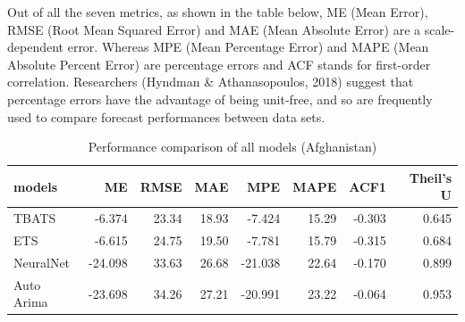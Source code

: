 \documentclass[11pt,oneside,a4paper]{reedthesis}
\newenvironment{Shaded}{\begin{snugshade}}{\end{snugshade}}
\newcommand{\KeywordTok}[1]{\textcolor[rgb]{0.13,0.29,0.53}{\textbf{#1}}}
\newcommand{\DataTypeTok}[1]{\textcolor[rgb]{0.13,0.29,0.53}{#1}}
\newcommand{\DecValTok}[1]{\textcolor[rgb]{0.00,0.00,0.81}{#1}}
\newcommand{\StringTok}[1]{\textcolor[rgb]{0.31,0.60,0.02}{#1}}
\newcommand{\OperatorTok}[1]{\textcolor[rgb]{0.81,0.36,0.00}{\textbf{#1}}}
\newcommand{\NormalTok}[1]{#1}
\begin{document}
Out of all the seven metrics, as shown in the table below, ME (Mean
Error), RMSE (Root Mean Squared Error) and MAE (Mean Absolute Error) are
a scale-dependent error. Whereas MPE (Mean Percentage Error) and MAPE
(Mean Absolute Percent Error) are percentage errors and ACF stands for
first-order correlation. Researchers (Hyndman \& Athanasopoulos, 2018)
suggest that percentage errors have the advantage of being unit-free,
and so are frequently used to compare forecast performances between data
sets.
\begin{Shaded}
\end{Shaded}
\begin{table}[H]

\caption{\label{tab:unnamed-chunk-72}Performance comparison of all models (Afghanistan)}
\centering
\fontsize{12}{14}\selectfont
\begin{tabular}[t]{lrrrrrrr}
\toprule
models & ME & RMSE & MAE & MPE & MAPE & ACF1 & Theil's U\\
\midrule
TBATS & -6.374 & 23.34 & 18.93 & -7.424 & 15.29 & -0.303 & 0.645\\
ETS & -6.615 & 24.75 & 19.50 & -7.781 & 15.79 & -0.315 & 0.684\\
NeuralNet & -24.098 & 33.63 & 26.68 & -21.038 & 22.64 & -0.170 & 0.899\\
Auto Arima & -23.698 & 34.26 & 27.21 & -20.991 & 23.22 & -0.064 & 0.953\\
\bottomrule
\end{tabular}
\end{table}
\end{document}
